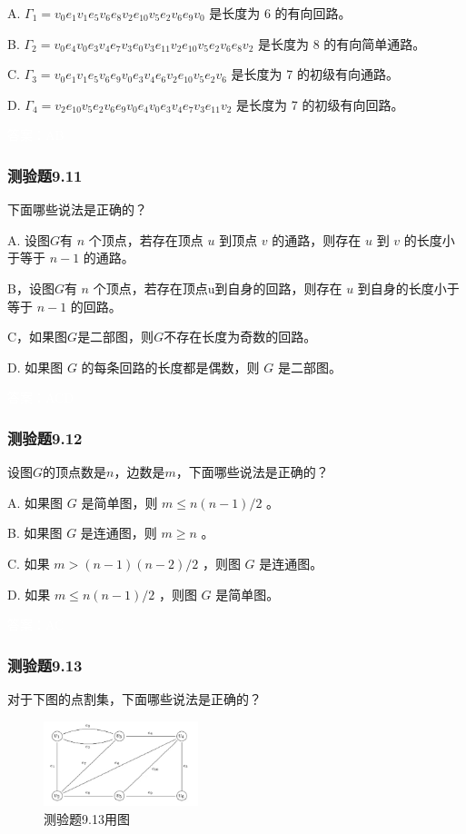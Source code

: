 \documentclass[UTF8, heading=true]{ctexart}
\begin{document}
A. $\Gamma_1=v_0 e_1 v_1 e_5 v_6 e_8 v_2 e_{10} v_5 e_2 v_6 e_9 v_0$ 是长度为 6 的有向回路。

B. $\Gamma_2=v_0 e_4 v_0 e_3 v_4 e_7 v_3 e_0 v_3 e_{11} v_2 e_{10} v_5 e_2 v_6 e_8 v_2$ 是长度为 8 的有向简单通路。

C. $\Gamma_3=v_0 e_1 v_1 e_5 v_6 e_9 v_0 e_3 v_4 e_6 v_2 e_{10} v_5 e_2 v_6$ 是长度为 7 的初级有向通路。

D. $\Gamma_4=v_2 e_{10} v_5 e_2 v_6 e_9 v_0 e_4 v_0 e_3 v_4 e_7 v_3 e_{11} v_2$ 是长度为 7 的初级有向回路。

\textcolor{white}{答案：AB}

\subsubsection{测验题9.11}

下面哪些说法是正确的？

A. 设图$G$有 $n$ 个顶点，若存在顶点 $u$ 到顶点 $v$ 的通路，则存在 $u$ 到 $v$ 的长度小于等于 $n-1$ 的通路。

B，设图$G$有 $n$ 个顶点，若存在顶点u到自身的回路，则存在 $u$ 到自身的长度小于等于 $n-1$ 的回路。

C，如果图$G$是二部图，则$G$不存在长度为奇数的回路。

D.  如果图 $G$ 的每条回路的长度都是偶数，则 $G$ 是二部图。

\textcolor{white}{答案：ACD}

\subsubsection{测验题9.12}

设图$G$的顶点数是$n$，边数是$m$，下面哪些说法是正确的？

A. 如果图 $G$ 是简单图，则 $m \leq n(n-1) / 2$ 。

B. 如果图 $G$ 是连通图，则 $m \geq n$ 。

C. 如果 $m>(n-1)(n-2) / 2$ ，则图 $G$ 是连通图。

D.  如果 $m \leq n(n-1) / 2$ ，则图 $G$ 是简单图。

\textcolor{white}{答案：AC}

\subsubsection{测验题9.13}

对于下图的点割集，下面哪些说法是正确的？

\begin{figure}[H]
    \centering
    \includegraphics[width=0.4\textwidth]{9.13.jpg} %
    \caption{测验题9.13用图}
\end{figure}
\end{document}
